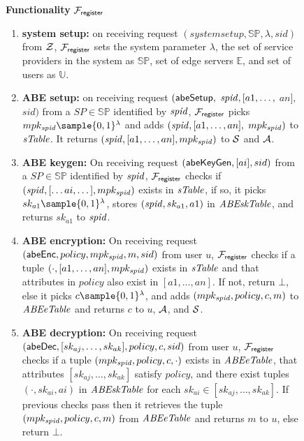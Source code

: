 \begin{figure}[H]
\begin{mdframed}
\begin{center}
\textbf{Functionality} $\mathcal{F}_{\mathsf{register}}$
\end{center}


\begin{enumerate}%

\item \textbf{system setup:} on receiving request $(systemsetup,\mathbb{SP},\lambda,sid)$ from $\mathcal{Z}$, $\mathcal{F}_{\mathsf{register}}$ sets the system parameter $\lambda$, the set of service providers in the system  as $\mathbb{SP}$, set of edge servers $\mathbb{E}$, and set of users as $\mathbb{U}$. %

\item \textbf{ABE setup:} on receiving request $(\mathsf{abeSetup},$ $\mathit{spid}, [a1,\dots,$ $an],$ $sid)$ from a $SP \in \mathbb{SP}$ identified by $\mathit{spid}$, $\mathcal{F}_{\mathsf{register}}$  %
picks $mpk_{\spid} \sample \{0,1\}^{\lambda}$ and adds 
$(\mathit{spid},[a1,\dots, an],$ $mpk_{\mathit{spid}})$ 
to $\mathit{sTable}$. It returns $(\mathit{spid},[a1,\dots, an],mpk_{\mathit{spid}})$ to $\mathcal{S}$ and $\mathcal{A}$. %

\item \textbf{ABE keygen:} On receiving request $(\mathsf{abeKeyGen},[ai],sid)$ from a $SP \in \mathbb{SP}$ identified by $\mathit{spid}$, $\mathcal{F}_{\mathsf{register}}$ checks if $(\mathit{spid},[\dots ai,\dots],mpk_{\mathit{spid}})$ exists in $\mathit{sTable}$, if so, it picks $sk_{a1} \sample \{0,1\}^{\lambda}$, stores $(\mathit{spid}, sk_{a1},a1)$ in $\mathit{ABEskTable}$, and returns $sk_{a1}$ to $\mathit{spid}$.

\item \textbf{ABE encryption:} On receiving request $(\mathsf{abeEnc},policy,mpk_{\mathit{spid}},m,sid)$ from user $u$, $\mathcal{F}_{\mathsf{register}}$ checks if a tuple $(\cdot,[a1,\dots, an],mpk_{\mathit{spid}})$ exists in $\mathit{sTable}$ and that attributes in $policy$ also exist in $[a1,\dots,an]$. If not, return $\bot$, else it picks $c \sample \{0,1\}^{\lambda}$, and adds  $(mpk_{\mathit{spid}},policy,c,m)$ to $\mathit{ABEeTable}$ and returns $c$ to $u$, $\mathcal{A}$, and $\mathcal{S}$. 

\item \textbf{ABE decryption:} On receiving request $(\mathsf{abeDec},[sk_{aj},\dots,sk_{ak}],policy,c,sid)$ from user $u$, $\mathcal{F}_{\mathsf{register}}$ checks if a tuple $(mpk_{\mathit{spid}},policy,c,\cdot)$ exists in $\mathit{ABEeTable}$, that attributes $[sk_{aj},\dots,sk_{ak}]$ satisfy $policy$, and  there exist tuples $(\cdot,sk_{ai},ai)$ in $\mathit{ABEskTable}$ for each $sk_{ai} \in [sk_{aj},\dots,sk_{ak}]$. %
If previous checks pass then it retrieves the tuple $(mpk_{\mathit{spid}},policy,c,m)$ from $\mathit{ABEeTable}$ and returns $m$ to $u$, else return $\bot$.


\end{enumerate}
\end{mdframed}
\end{figure}
